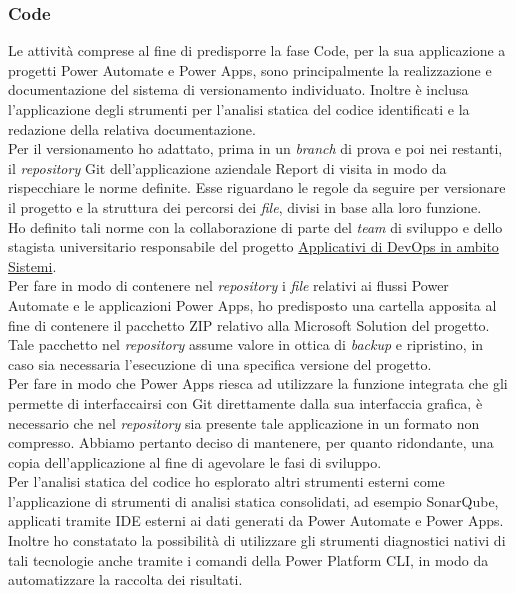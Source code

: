 \subsubsection*{Code}
Le attività comprese al fine di predisporre la fase Code, per la sua applicazione a progetti Power Automate e Power Apps, sono principalmente la realizzazione e documentazione del sistema di versionamento individuato.
Inoltre è inclusa l'applicazione degli strumenti per l'analisi statica del codice identificati e la redazione della relativa documentazione.\\
Per il versionamento ho adattato, prima in un \emph{branch} di prova e poi nei restanti, il \emph{repository} Git dell'applicazione aziendale Report di visita in modo da rispecchiare le norme definite.
Esse riguardano le regole da seguire per versionare il progetto e la struttura dei percorsi dei \emph{file}, divisi in base alla loro funzione.\\  
Ho definito tali norme con la collaborazione di parte del \emph{team} di sviluppo e dello stagista universitario responsabile del progetto \hyperref[stageDavide]{Applicativi di DevOps in ambito Sistemi}.\\ 
Per fare in modo di contenere nel \emph{repository} i \emph{file} relativi ai flussi Power Automate e le applicazioni Power Apps, ho predisposto una cartella apposita al fine di contenere il pacchetto ZIP relativo alla Microsoft Solution del progetto.\\ 
Tale pacchetto nel \emph{repository} assume valore in ottica di \emph{backup} e ripristino, in caso sia necessaria l'esecuzione di una specifica versione del progetto.\\  
Per fare in modo che Power Apps riesca ad utilizzare la funzione integrata che gli permette di interfaccairsi con Git direttamente dalla sua interfaccia grafica, è necessario che nel \emph{repository} sia presente tale applicazione in un formato non compresso.
Abbiamo pertanto deciso di mantenere, per quanto ridondante, una copia dell'applicazione al fine di agevolare le fasi di sviluppo.\\ 
Per l'analisi statica del codice ho esplorato altri strumenti esterni come l'applicazione di strumenti di analisi statica consolidati, ad esempio SonarQube, applicati tramite IDE esterni ai dati generati da Power Automate e Power Apps.\\  
Inoltre ho constatato la possibilità di utilizzare gli strumenti diagnostici nativi di tali tecnologie anche tramite i comandi della Power Platform CLI, in modo da automatizzare la raccolta dei risultati.\\ 
